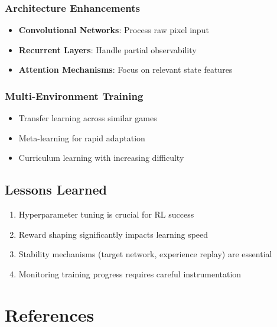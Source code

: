 \documentclass[12pt,a4paper]{article}
\begin{document}
\subsubsection{Architecture Enhancements}
\begin{itemize}
    \item \textbf{Convolutional Networks}: Process raw pixel input
    \item \textbf{Recurrent Layers}: Handle partial observability
    \item \textbf{Attention Mechanisms}: Focus on relevant state features
\end{itemize}

\subsubsection{Multi-Environment Training}
\begin{itemize}
    \item Transfer learning across similar games
    \item Meta-learning for rapid adaptation
    \item Curriculum learning with increasing difficulty
\end{itemize}

\subsection{Lessons Learned}
\begin{enumerate}
    \item Hyperparameter tuning is crucial for RL success
    \item Reward shaping significantly impacts learning speed
    \item Stability mechanisms (target network, experience replay) are essential
    \item Monitoring training progress requires careful instrumentation
\end{enumerate}

\section{References}
\end{document}
